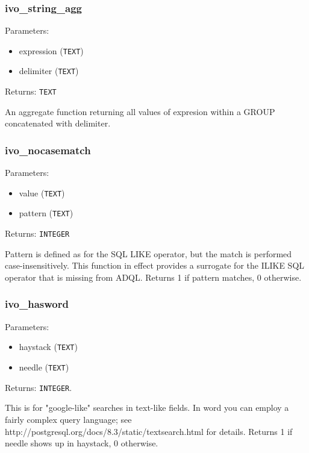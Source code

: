 \documentclass[11pt,a4paper]{ivoa}
\begin{document}
\subsubsection{ivo\_string\_agg}

Parameters:

\begin{itemize}
	\item expression (\texttt{TEXT})
	\item delimiter (\texttt{TEXT})
\end{itemize}

Returns: \texttt{TEXT}

An aggregate function returning all values of expresion within a GROUP
concatenated with delimiter.

\subsubsection{ivo\_nocasematch}

Parameters:

\begin{itemize}
	\item value (\texttt{TEXT})
	\item pattern (\texttt{TEXT})
\end{itemize}

Returns: \texttt{INTEGER}

Pattern is defined as for the SQL LIKE operator, but the match is
performed case-insensitively. This function in effect provides a
surrogate for the ILIKE SQL operator that is missing from ADQL. Returns
1 if pattern matches, 0 otherwise.

\subsubsection{ivo\_hasword}

Parameters:

\begin{itemize}
	\item haystack (\texttt{TEXT})
	\item needle (\texttt{TEXT})
\end{itemize}

Returns: \texttt{INTEGER}.

This is for "google-like" searches in text-like fields. In word you can
employ a fairly complex query language; see
http://postgresql.org/docs/8.3/static/textsearch.html for details.
Returns 1 if needle shows up in haystack, 0 otherwise.
\end{document}
